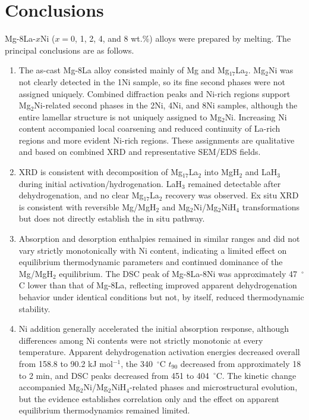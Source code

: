 \documentclass[preprint,12pt]{elsarticle}
\begin{document}
\section{Conclusions}
Mg-8La-$x$Ni ($x=0$, 1, 2, 4, and 8 wt.\%) alloys were prepared by melting. The principal conclusions are as follows.
\begin{enumerate}
\item The as-cast Mg-8La alloy consisted mainly of Mg and Mg$_{17}$La$_2$. Mg$_2$Ni was not clearly detected in the 1Ni sample, so its fine second phases were not assigned uniquely. Combined diffraction peaks and Ni-rich regions support Mg$_2$Ni-related second phases in the 2Ni, 4Ni, and 8Ni samples, although the entire lamellar structure is not uniquely assigned to Mg$_2$Ni. Increasing Ni content accompanied local coarsening and reduced continuity of La-rich regions and more evident Ni-rich regions. These assignments are qualitative and based on combined XRD and representative SEM/EDS fields.
\item XRD is consistent with decomposition of Mg$_{17}$La$_2$ into MgH$_2$ and LaH$_3$ during initial activation/hydrogenation. LaH$_3$ remained detectable after dehydrogenation, and no clear Mg$_{17}$La$_2$ recovery was observed. Ex situ XRD is consistent with reversible Mg/MgH$_2$ and Mg$_2$Ni/Mg$_2$NiH$_4$ transformations but does not directly establish the in situ pathway.
\item Absorption and desorption enthalpies remained in similar ranges and did not vary strictly monotonically with Ni content, indicating a limited effect on equilibrium thermodynamic parameters and continued dominance of the Mg/MgH$_2$ equilibrium. The DSC peak of Mg-8La-8Ni was approximately 47~$^{\circ}$C lower than that of Mg-8La, reflecting improved apparent dehydrogenation behavior under identical conditions but not, by itself, reduced thermodynamic stability.
\item Ni addition generally accelerated the initial absorption response, although differences among Ni contents were not strictly monotonic at every temperature. Apparent dehydrogenation activation energies decreased overall from 158.8 to 90.2 kJ mol$^{-1}$, the 340~$^{\circ}$C $t_{90}$ decreased from approximately 18 to 2 min, and DSC peaks decreased from 451 to 404~$^{\circ}$C. The kinetic change accompanied Mg$_2$Ni/Mg$_2$NiH$_4$-related phases and microstructural evolution, but the evidence establishes correlation only and the effect on apparent equilibrium thermodynamics remained limited.
\end{enumerate}
\end{document}
